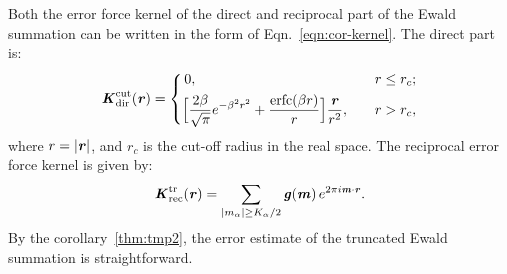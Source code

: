 \documentclass[aps,pre,preprint,unsortedaddress]{revtex4}
\renewcommand{\v}[1]{\textbf{\textit{#1}}}
\begin{document}
Both the error force kernel of the direct and reciprocal
part of the Ewald summation can be
written in the form of Eqn.~\eqref{eqn:cor-kernel}.  The direct
part is:
\begin{align}
  \v K^{\textrm{cut}}_{\textrm{dir}}(\v r) =
  \left\{
    \begin{aligned}
      &\,0, &\quad & r \leq r_c;\\
      &
      \Big[
      \frac{2\beta}{\sqrt\pi} e^{-\beta^2r^2} + \frac{\textrm{erfc}(\beta r)}{r}
      \Big]\frac{\v r}{r^2}
      ,& & r > r_c,
    \end{aligned}
  \right.
\end{align}
where $r = \vert\v r\vert$, and $r_c$ is the cut-off radius in the
real space.
The reciprocal error force kernel is given by:
\begin{align}
  \v K^{\textrm{tr}}_{\textrm{rec}}(\v r) =
  \sum_{
      \vert m_\alpha\vert \geq K_\alpha/2}
  \v g(\v m) \,
  e^{2\pi i\v m\cdot\v r}.
\end{align}
By the corollary~\ref{thm:tmp2}, the error estimate of the
truncated Ewald summation is straightforward.


\end{document}
